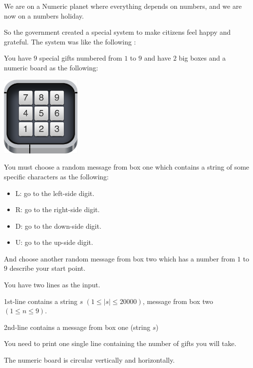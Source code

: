 \legend

    We are on a Numeric planet where everything depends on numbers, and we are now on a numbers holiday.

    So the government created a special system to make citizens feel happy and grateful.
    The system was like the following :

    You have $9$ special gifts numbered from $1$ to $9$ and have $2$ big boxes and a numeric board as the following:

    \begin{center}
        \def \htmlPixelsInCm {45}
        \includegraphics[width=4cm]{assets/1to9.png} \\
    \end{center}


    You must choose a random message from box one which contains a string of some specific characters as the following:

    \begin{itemize}
        \item L: go to the left-side digit.
        \item R: go to the right-side digit.
        \item D: go to the down-side digit.
        \item U: go to the up-side digit.
    \end{itemize}

    And choose another random message from box two which has a number from $1$ to $9$ describe your start point.



    You have two lines as the input.

    1st-line contains a string $s$ $(1 \le \vert s \vert \le 20000)$, message from box two $(1 \le n \le 9)$.

    2nd-line contains a message from box one (string $s$)

\output

    You need to print one single line containing the number of gifts you will take.

\note

    The numeric board is circular vertically and horizontally.